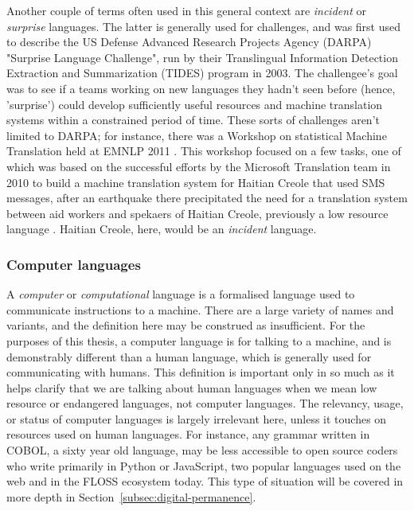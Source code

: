 Another couple of terms often used in this general context are \textit{incident} or \textit{surprise} languages. The latter is generally used for challenges, and was first used to describe the US Defense Advanced Research Projects Agency (DARPA) "Surprise Language Challenge", run by their Translingual Information Detection Extraction and Summarization (TIDES) program in 2003. The challengee's goal was to see if a teams working on new languages they hadn't seen before (hence, 'surprise') could develop sufficiently useful resources and machine translation systems within a constrained period of time. \citep{oard2003surprise} These sorts of challenges aren't limited to DARPA; for instance, there was a Workshop on statistical Machine Translation held at EMNLP 2011 \citep{callison2011findings}. This workshop focused on a few tasks, one of which was based on the successful efforts by the Microsoft Translation team in 2010 to build a machine translation system for Haitian Creole that used SMS messages, after an earthquake there precipitated the need for a translation system between aid workers and spekaers of Haitian Creole, previously a low resource language \citep{lewis2010haitian, lewis2011crisis}. Haitian Creole, here, would be an \textit{incident} language.

\subsubsection{Computer languages}

A \textit{computer} or \textit{computational} language is a formalised language used to communicate instructions to a machine. There are a large variety of names and variants, and the definition here may be construed as insufficient. For the purposes of this thesis, a computer language is for talking to a machine, and is demonstrably different than a human language, which is generally used for communicating with humans. This definition is important only in so much as it helps clarify that we are talking about human languages when we mean low resource or endangered languages, not computer languages. The relevancy, usage, or status of computer languages is largely irrelevant here, unless it touches on resources used on human languages. For instance, any grammar written in COBOL, a sixty year old language, may be less accessible to open source coders who write primarily in Python or JavaScript, two popular languages used on the web and in the FLOSS ecosystem today. This type of situation will be covered in more depth in Section~\ref{subsec:digital-permanence}.

